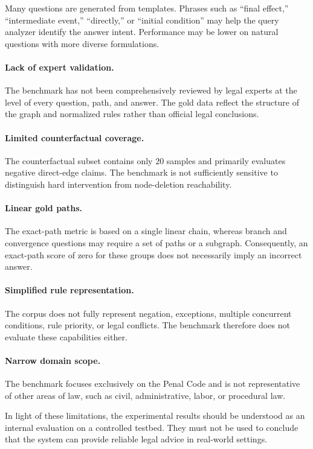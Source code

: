 Many questions are generated from templates. Phrases such as ``final effect,''
``intermediate event,'' ``directly,'' or ``initial condition'' may help the
query analyzer identify the answer intent. Performance may be lower on natural
questions with more diverse formulations.

\paragraph{Lack of expert validation.}

The benchmark has not been comprehensively reviewed by legal experts at the
level of every question, path, and answer. The gold data reflect the structure
of the graph and normalized rules rather than official legal conclusions.

\paragraph{Limited counterfactual coverage.}

The counterfactual subset contains only \(20\) samples and primarily evaluates
negative direct-edge claims. The benchmark is not sufficiently sensitive to
distinguish hard intervention from node-deletion reachability.

\paragraph{Linear gold paths.}

The exact-path metric is based on a single linear chain, whereas branch and
convergence questions may require a set of paths or a subgraph. Consequently,
an exact-path score of zero for these groups does not necessarily imply an
incorrect answer.

\paragraph{Simplified rule representation.}

The corpus does not fully represent negation, exceptions, multiple concurrent
conditions, rule priority, or legal conflicts. The benchmark therefore does
not evaluate these capabilities either.

\paragraph{Narrow domain scope.}

The benchmark focuses exclusively on the Penal Code and is not representative
of other areas of law, such as civil, administrative, labor, or procedural
law.

In light of these limitations, the experimental results should be understood
as an internal evaluation on a controlled testbed. They must not be used to
conclude that the system can provide reliable legal advice in real-world
settings.
